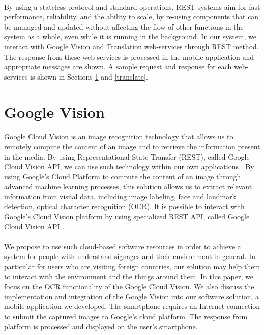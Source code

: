 \documentclass[12pt]{article}
\begin{document}
\paragraph{}By using a stateless protocol and standard operations, REST systems aim for fast performance, reliability, and the ability to scale, by re-using components that can be managed and updated without affecting the flow of other functions in the system as a whole, even while it is running in the background. In our system, we interact with Google Vision and Translation web-services through REST method. The response from these web-services is processed in the mobile application and appropriate messages are shown. A sample request and response for each web-services is shown in Sections \ref{vision} and \ref{translate}.

\section{Google Vision}
\label{vision}
\paragraph{}Google Cloud Vision is an image recognition technology that allows us to remotely compute the content of an image and to retrieve the information present in the media. By using Representational State Transfer (REST), called Google Cloud Vision API, we can use such technology within our own applications \cite{vision}. By using Google’s Cloud Platform to compute the content of an image through advanced machine learning processes, this solution allows us to extract relevant information from visual data, including image labeling, face and landmark detection, optical character recognition (OCR). It is possible to interact with Google’s Cloud Vision platform by using specialized REST API, called Google Cloud Vision API \cite{vision}.

\paragraph{}We propose to use such cloud-based software resources in order to achieve a system for people with understand signages and their environment in general. In particular for users who are visiting foreign countries, our solution may help them to interact with the environment and the things around them. In this paper, we focus on the OCR functionality of the Google Cloud Vision. We also discuss the implementation and integration of the Google Vision into our software solution, a mobile application we developed. The smartphone requires an Internet connection to submit the captured images to Google’s cloud platform. The response from platform is processed and displayed on the user's smartphone.
\end{document}
